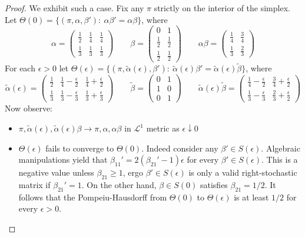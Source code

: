 \documentclass{article}
\theoremstyle{definition}
\begin{document}
\begin{proof}
    We exhibit such a case.  Fix any $\pi$ strictly on the interior of the simplex.  Let $\Theta(0)=\{(\pi,\alpha,\beta'):\ \alpha\beta'=\alpha\beta\}$, where
    \[
    \alpha=\left(\begin{array}{ccc}
    \frac{1}{2} & \frac{1}{4} & \frac{1}{4}\\
    \frac{1}{3} & \frac{1}{3} & \frac{1}{3}
    \end{array}\right)
    \qquad
    \beta=\left(\begin{array}{cc}
    0 & 1\\
    \frac{1}{2} & \frac{1}{2}\\
    \frac{1}{2} & \frac{1}{2}
    \end{array}\right)
    \qquad
    \alpha\beta=\left(\begin{array}{cc}
    \frac{1}{4} & \frac{3}{4}\\
    \frac{1}{3} & \frac{2}{3}
    \end{array}\right)
    \]
    For each $\epsilon>0$ let $\Theta(\epsilon) =\{(\pi,\tilde \alpha(\epsilon),\beta'):\ \tilde \alpha(\epsilon)\beta'=\tilde \alpha(\epsilon) \tilde \beta\}$, where
    \[
    \tilde \alpha(\epsilon)=\left(\begin{array}{ccc}
    \frac{1}{2} & \frac{1}{4}-\frac{\epsilon}{2} & \frac{1}{4}+\frac{\epsilon}{2}\\
    \frac{1}{3} & \frac{1}{3}-\frac{\epsilon}{3} & \frac{1}{3}+\frac{\epsilon}{3}
    \end{array}\right)\qquad
    \tilde \beta=\left(\begin{array}{cc}
    0 & 1\\
    1 & 0\\
    0 & 1
    \end{array}\right)\qquad
    \tilde \alpha(\epsilon) \tilde \beta=\left(\begin{array}{cc}
    \frac{1}{4} -\frac{\epsilon}{2}& \frac{3}{4}+\frac{\epsilon}{2}\\
    \frac{1}{3}-\frac{\epsilon}{3} & \frac{2}{3}+\frac{\epsilon}{2}
    \end{array}\right)
    \]
    Now observe:
    \begin{itemize}
        \item $\pi,\tilde \alpha(\epsilon),\tilde \alpha(\epsilon)\beta \rightarrow \pi,\alpha,\alpha\beta$ in $\mathscr{L}^1$ metric as $\epsilon\downarrow 0$
        \item $\Theta(\epsilon)$ fails to converge to $\Theta(0)$.  Indeed consider any $\beta' \in S(\epsilon)$.  Algebraic manipulations yield that $\beta_{11}'=2(\beta_{21}'-1)\epsilon$ for every $\beta' \in S(\epsilon)$.  This is a negative value unless $\beta_{21}\geq 1$, ergo $\beta' \in S(\epsilon)$ is only a valid right-stochastic matrix if $\beta_{21}'=1$.  On the other hand, $\beta \in S(0)$ satisfies $\beta_{21}=1/2$.  It follows that the Pompeiu-Hausdorff from $\Theta(0)$ to $\Theta(\epsilon)$ is at least $1/2$ for every $\epsilon>0$.
    \end{itemize}


\end{proof}
\end{document}
